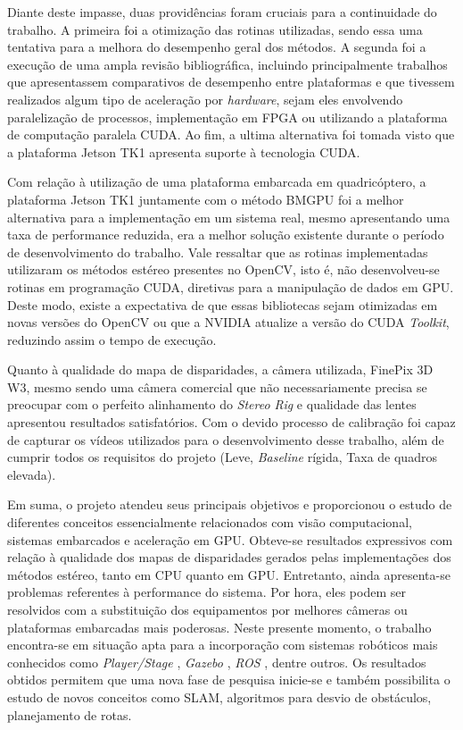 Diante deste impasse, duas providências foram cruciais para a continuidade do trabalho. A primeira foi a otimização das rotinas utilizadas, sendo essa uma tentativa para a melhora do desempenho geral dos métodos. A segunda foi a execução de uma ampla revisão bibliográfica, incluindo principalmente trabalhos que apresentassem comparativos de desempenho entre plataformas e que tivessem realizados algum tipo de aceleração por \textit{hardware}, sejam eles envolvendo paralelização de processos, implementação em FPGA ou utilizando a plataforma de computação paralela CUDA. Ao fim, a ultima alternativa foi tomada visto que a plataforma Jetson TK1 apresenta suporte à tecnologia CUDA.

Com relação à utilização de uma plataforma embarcada em quadricóptero, a plataforma Jetson TK1 juntamente com o método BMGPU foi a melhor alternativa para a implementação em um sistema real, mesmo apresentando uma taxa de performance reduzida, era a melhor solução existente durante o período de desenvolvimento do trabalho. Vale ressaltar que as rotinas implementadas utilizaram os métodos estéreo presentes no OpenCV, isto é, não desenvolveu-se rotinas em programação CUDA, diretivas para a manipulação de dados em GPU. Deste modo, existe a expectativa de que essas bibliotecas sejam otimizadas em novas versões do OpenCV ou que a NVIDIA atualize a versão do CUDA \textit{Toolkit}, reduzindo assim o tempo de execução.

Quanto à qualidade do mapa de disparidades, a câmera utilizada, FinePix 3D W3, mesmo sendo uma câmera comercial que não necessariamente precisa se preocupar com o perfeito alinhamento do \textit{Stereo Rig} e qualidade das lentes apresentou resultados satisfatórios. Com o devido processo de calibração foi capaz de capturar os vídeos utilizados para o desenvolvimento desse trabalho, além de cumprir todos os requisitos do projeto (Leve, \textit{Baseline} rígida, Taxa de quadros elevada).

Em suma, o projeto atendeu seus principais objetivos e proporcionou o estudo de diferentes conceitos essencialmente relacionados com visão computacional, sistemas embarcados e aceleração em GPU. Obteve-se resultados expressivos com relação à qualidade dos mapas de disparidades gerados pelas implementações dos métodos estéreo, tanto em CPU quanto em GPU. Entretanto, ainda apresenta-se problemas referentes à performance do sistema. Por hora, eles podem ser resolvidos com a substituição dos equipamentos por melhores câmeras ou plataformas embarcadas mais poderosas. Neste presente momento, o trabalho encontra-se em situação apta para a incorporação com sistemas robóticos mais conhecidos como \textit{Player/Stage} \cite{Gerkey2010}, \textit{Gazebo} \cite{Gazebo}, \textit{ROS} \cite{ROS}, dentre outros. Os resultados obtidos permitem que uma nova fase de pesquisa inicie-se e também possibilita o estudo de novos conceitos como SLAM, algoritmos para desvio de obstáculos, planejamento de rotas.

